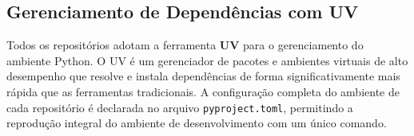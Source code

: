 \documentclass[12pt, %
openright, 
oneside, %
a4paper,    %
brazil]{facom-ufu-abntex2}
\begin{document}
\begin{apendicesenv}
\section*{Gerenciamento de Dependências com UV}

Todos os repositórios adotam a ferramenta \textbf{UV} para o gerenciamento do ambiente Python. O UV é um gerenciador de pacotes e ambientes virtuais de alto desempenho que resolve e instala dependências de forma significativamente mais rápida que as ferramentas tradicionais. A configuração completa do ambiente de cada repositório é declarada no arquivo \texttt{pyproject.toml}, permitindo a reprodução integral do ambiente de desenvolvimento com um único comando.

\end{apendicesenv}












\printindex
\end{document}
